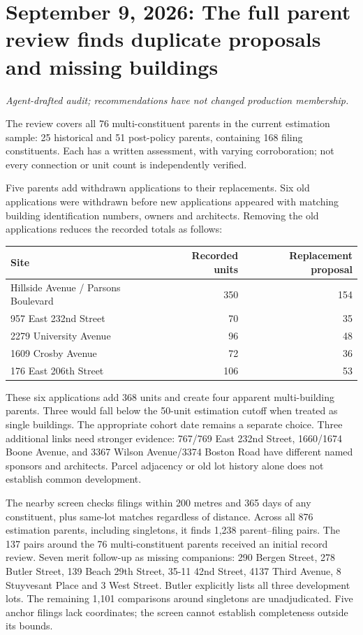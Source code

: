 \clearpage
\section*{September 9, 2026: The full parent review finds duplicate proposals and missing buildings}
\textit{Agent-drafted audit; recommendations have not changed production membership.}

The review covers all 76 multi-constituent parents in the current estimation sample: 25 historical and 51 post-policy parents, containing 168 filing constituents. Each has a written assessment, with varying corroboration; not every connection or unit count is independently verified.

Five parents add withdrawn applications to their replacements. Six old applications were withdrawn before new applications appeared with matching building identification numbers, owners and architects. Removing the old applications reduces the recorded totals as follows:

\begin{center}
\begin{tabular}{lrr}
\hline
Site & Recorded units & Replacement proposal \\
\hline
Hillside Avenue / Parsons Boulevard & 350 & 154 \\
957 East 232nd Street & 70 & 35 \\
2279 University Avenue & 96 & 48 \\
1609 Crosby Avenue & 72 & 36 \\
176 East 206th Street & 106 & 53 \\
\hline
\end{tabular}
\end{center}

These six applications add 368 units and create four apparent multi-building parents. Three would fall below the 50-unit estimation cutoff when treated as single buildings. The appropriate cohort date remains a separate choice. Three additional links need stronger evidence: 767/769 East 232nd Street, 1660/1674 Boone Avenue, and 3367 Wilson Avenue/3374 Boston Road have different named sponsors and architects. Parcel adjacency or old lot history alone does not establish common development.

The nearby screen checks filings within 200 metres and 365 days of any constituent, plus same-lot matches regardless of distance. Across all 876 estimation parents, including singletons, it finds 1,238 parent--filing pairs. The 137 pairs around the 76 multi-constituent parents received an initial record review. Seven merit follow-up as missing companions: 290 Bergen Street, 278 Butler Street, 139 Beach 29th Street, 35-11 42nd Street, 4137 Third Avenue, 8 Stuyvesant Place and 3 West Street. Butler explicitly lists all three development lots. The remaining 1,101 comparisons around singletons are unadjudicated. Five anchor filings lack coordinates; the screen cannot establish completeness outside its bounds.

